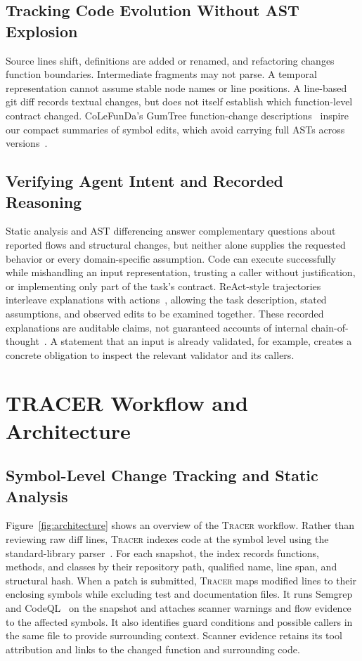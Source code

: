 \documentclass[10pt,conference]{IEEEtran}
\newcommand{\tracer}{\textsc{Tracer}}
\newcommand{\code}[1]{\texttt{\detokenize{#1}}}
\begin{document}
\subsection{Tracking Code Evolution Without AST Explosion}
Source lines shift, definitions are added or renamed, and refactoring changes function boundaries. Intermediate fragments may not parse. A temporal representation cannot assume stable node names or line positions. A line-based git diff records textual changes, but does not itself establish which function-level contract changed. CoLeFunDa's GumTree function-change descriptions~\cite{colefunda} inspire our compact summaries of symbol edits, which avoid carrying full ASTs across versions~\cite{gumtree,gumtree3}.

\subsection{Verifying Agent Intent and Recorded Reasoning}
Static analysis and AST differencing answer complementary questions about reported flows and structural changes, but neither alone supplies the requested behavior or every domain-specific assumption. Code can execute successfully while mishandling an input representation, trusting a caller without justification, or implementing only part of the task's contract. ReAct-style trajectories interleave explanations with actions~\cite{react}, allowing the task description, stated assumptions, and observed edits to be examined together. These recorded explanations are auditable claims, not guaranteed accounts of internal chain-of-thought~\cite{turpin,lanham}. A statement that an input is already validated, for example, creates a concrete obligation to inspect the relevant validator and its callers.

\section{TRACER Workflow and Architecture}
\label{sec:architecture}
\subsection{Symbol-Level Change Tracking and Static Analysis}
Figure~\ref{fig:architecture} shows an overview of the \tracer{} workflow. Rather than reviewing raw diff lines, \tracer{} indexes code at the symbol level using the standard-library \code{ast.parse} parser~\cite{pythonast}. For each snapshot, the index records functions, methods, and classes by their repository path, qualified name, line span, and structural hash. When a patch is submitted, \tracer{} maps modified lines to their enclosing symbols while excluding test and documentation files. It runs Semgrep~\cite{semgrep} and CodeQL~\cite{codeql} on the snapshot and attaches scanner warnings and flow evidence to the affected symbols. It also identifies guard conditions and possible callers in the same file to provide surrounding context. Scanner evidence retains its tool attribution and links to the changed function and surrounding code.
\end{document}
